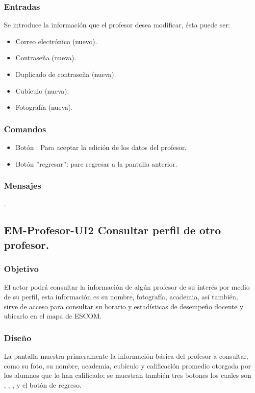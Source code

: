\subsubsection{Entradas}
	\noindent
	Se introduce la información que el profesor desea modificar, ésta puede ser:
	\begin{itemize}
		\item Correo electrónico (nuevo).
		\item Contraseña (nueva).
		\item Duplicado de contraseña (nueva). 
		\item Cubículo (nueva).
		\item Fotografía (nueva). 
	\end{itemize}

\subsubsection{Comandos}
	\begin{itemize}
		\item Botón : Para aceptar la edición de los datos del profesor.
		\item Botón ''regresar'': pare regresar a la pantalla anterior.
	\end{itemize}

\subsubsection{Mensajes}
	\begin{Citemize}
		\item {}.
	\end{Citemize}

\subsection{EM-Profesor-UI2 Consultar perfil de otro profesor.}

\subsubsection{Objetivo}
	\noindent
	El actor podrá consultar la información de algún profesor de su interés por medio de su perfil, esta información es su nombre, fotografía, academia, así también, sirve de acceso para consultar su horario y estadísticas de desempeño docente y ubicarlo en el mapa de ESCOM.


\subsubsection{Diseño}
	\noindent
	La pantalla muestra primeramente la información básica del profesor a consultar, como su foto, su nombre, academia, cubículo y calificación promedio otorgada por los alumnos que lo han calificado; se muestran también tres botones los cuales son , , ,  y el botón de regreso.

